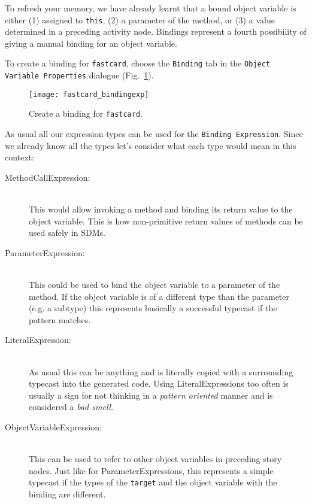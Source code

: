 To refresh your memory, we have already learnt that a bound object variable is either (1) assigned to \texttt{this}, (2) a parameter of the method, or (3) a
value determined in a preceding activity node. Bindings represent a fourth possibility of giving a manual binding for an object variable.

To create a binding for \texttt{fastcard}, choose the \texttt{Binding} tab in the \texttt{Object Variable Properties} dialogue (Fig.~\ref{fig:sdm_fastcard_3}).

\begin{figure}[htbp]
\begin{center}
  \texttt{[image: fastcard\_bindingexp]}
  \caption{Create a binding for \texttt{fastcard}.}  
  \label{fig:sdm_fastcard_3}
\end{center}
\end{figure}

As usual all our expression types can be used for the \texttt{Binding Expression}.  
Since we already know all the types let's consider what each type would mean in this context: 
\begin{description}
  \item[MethodCallExpression:]~\\ This would allow invoking a method and binding
  its return value to the object variable.  This is how non-primitive return
  values of methods can be used safely in SDMs.
  \item[ParameterExpression:]~\\ This could be used to bind the object variable
  to a parameter of the method.  If the object variable is of a different type
  than the parameter (e.g. a subtype) this represents basically a successful
  typecast if the pattern matches.
  \item[LiteralExpression:]~\\ As usual this can be anything and is literally
  copied with a surrounding typecast into the generated code.  Using
  LiteralExpressions too often is usually a sign for not thinking in a
  \emph{pattern oriented} manner and is considered a \emph{bad smell}.
  \item[ObjectVariableExpression:]~\\ This can be used to refer to other object
  variables in preceding story nodes.  Just like for ParameterExpressions, this
  represents a simple typecast if the types of the \texttt{target} and the
  object variable with the binding are different.
\end{description}

